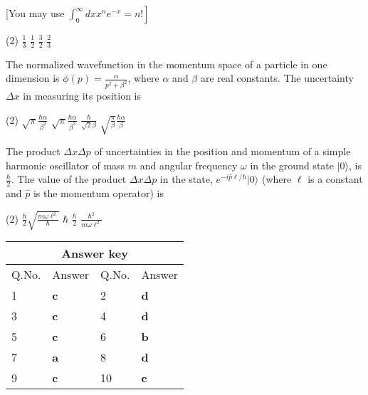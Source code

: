 \begin{enumerate}
\begin{minipage}{\textwidth}
	[You may use $\left.\int_{0}^{\infty} d x x^{n} e^{-x}=n !\right]$
\end{minipage}
\begin{tasks}(2)
	\task[\textbf{A.}] $\frac{1}{3}$
	\task[\textbf{B.}]$\frac{1}{2}$
	\task[\textbf{C.}]$\frac{3}{2}$
	\task[\textbf{D.}]$\frac{2}{3}$
\end{tasks}
\begin{minipage}{\textwidth}
	\item The normalized wavefunction in the momentum space of a particle in one dimension is $\phi(p)=\frac{\alpha}{p^{2}+\beta^{2}}$, where $\alpha$ and $\beta$ are real constants. The uncertainty $\Delta x$ in measuring its position is
\end{minipage}
\begin{tasks}(2)
	\task[\textbf{A.}] $\sqrt{\pi} \frac{\hbar \alpha}{\beta^{2}}$
	\task[\textbf{B.}]$\sqrt{\pi} \frac{\hbar \alpha}{\beta^{3}}$
	\task[\textbf{C.}]$\frac{\hbar}{\sqrt{2} \beta}$
	\task[\textbf{D.}]$\sqrt{\frac{\pi}{\beta}} \frac{\hbar \alpha}{\beta}$
\end{tasks}
\begin{minipage}{\textwidth}
	\item The product $\Delta x \Delta p$ of uncertainties in the position and momentum of a simple harmonic oscillator of mass $m$ and angular frequency $\omega$ in the ground state $|0\rangle$, is $\frac{\hbar}{2}$. The value of the product $\Delta x \Delta p$ in the state, $e^{-i \hat{p} \ell / \hbar}|0\rangle$ (where $\ell$ is a constant and $\hat{p}$ is the momentum operator) is
\end{minipage}
\begin{tasks}(2)
	\task[\textbf{A.}] $\frac{\hbar}{2} \sqrt{\frac{m \omega \ell^{2}}{\hbar}}$
	\task[\textbf{B.}]$\hbar$
	\task[\textbf{C.}] $\frac{\hbar}{2}$
	\task[\textbf{D.}] $\frac{\hbar^{2}}{m \omega \ell^{2}}$
\end{tasks}
\end{enumerate}
\setlength\arrayrulewidth{1pt}
\begin{table}[H]
	\centering
	
	\begin{tabular}{|p{1.5cm}|p{1.5cm}||p{1.5cm}|p{1.5cm}|}
		\hline
		\multicolumn{4}{|c|}{\textbf{Answer key}}\\\hline\hline
		\rowcolor{ocrel}Q.No.&Answer&Q.No.&Answer\\\hline
		1&\textbf{c}&2&\textbf{d}\\\hline
		3&\textbf{c}&4&\textbf{d}\\\hline
		5&\textbf{c}&6&\textbf{b}\\\hline
		7&\textbf{a}&8&\textbf{d}\\\hline
		9&\textbf{c}&10&\textbf{c}\\\hline
	\end{tabular}
\end{table}


